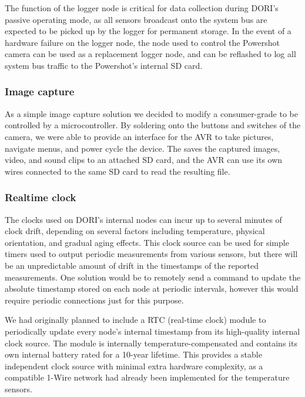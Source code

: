     The function of the logger node is critical for data collection during DORI's passive operating mode, as all sensors broadcast onto the system bus are expected to be picked up by the logger for permanent storage. In the event of a hardware failure on the logger node, the node used to control the Powershot camera can be used as a replacement logger node, and can be reflashed to log all system bus traffic to the Powershot's internal SD card.

    \subsubsection*{Image capture}
    As a simple image capture solution we decided to modify a consumer-grade  to be controlled by a microcontroller. By soldering onto the buttons and switches of the camera, we were able to provide an interface for the AVR to take pictures, navigate menus, and power cycle the device. The  saves the captured images, video, and sound clips to an attached SD card, and the AVR can use its own wires connected to the same SD card to read the resulting file.

    \subsubsection*{Realtime clock}
    The clocks used on DORI's internal nodes can incur up to several minutes of clock drift, depending on several factors including temperature, physical orientation, and gradual aging effects. This clock source can be used for simple timers used to output periodic measurements from various sensors, but there will be an unpredictable amount of drift in the timestamps of the reported measurements. One solution would be to remotely send a command to update the absolute timestamp stored on each node at periodic intervals, however this would require periodic connections just for this purpose.

    We had originally planned to include a  RTC (real-time clock) module to periodically update every node's internal timestamp from its high-quality internal clock source. The  module is internally temperature-compensated and contains its own internal battery rated for a 10-year lifetime. This provides a stable independent clock source with minimal extra hardware complexity, as a compatible 1-Wire network had already been implemented for the  temperature sensors.

